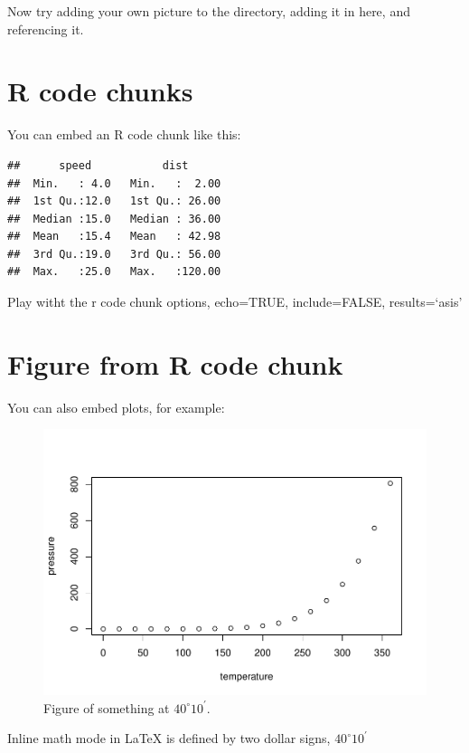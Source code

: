 \documentclass[12pt,]{article}
\begin{document}
Now try adding your own picture to the directory, adding it in here, and
referencing it.

\section{R code chunks}\label{r-code-chunks}

You can embed an R code chunk like this:

\begin{verbatim}
##      speed           dist       
##  Min.   : 4.0   Min.   :  2.00  
##  1st Qu.:12.0   1st Qu.: 26.00  
##  Median :15.0   Median : 36.00  
##  Mean   :15.4   Mean   : 42.98  
##  3rd Qu.:19.0   3rd Qu.: 56.00  
##  Max.   :25.0   Max.   :120.00
\end{verbatim}

Play witht the r code chunk options, echo=TRUE, include=FALSE,
results=`asis'

\FloatBarrier

\section{Figure from R code chunk}\label{figure-from-r-code-chunk}

You can also embed plots, for example:

\begin{figure}[htbp]
\centering
\includegraphics{4-Workshop_examples_files/figure-latex/pressure-1.pdf}
\caption{Figure of something at \(40^\circ 10^\prime\).
\label{fig:pressure}}
\end{figure}

Inline math mode in LaTeX is defined by two dollar signs,
\(40^\circ 10^\prime\)
\end{document}
